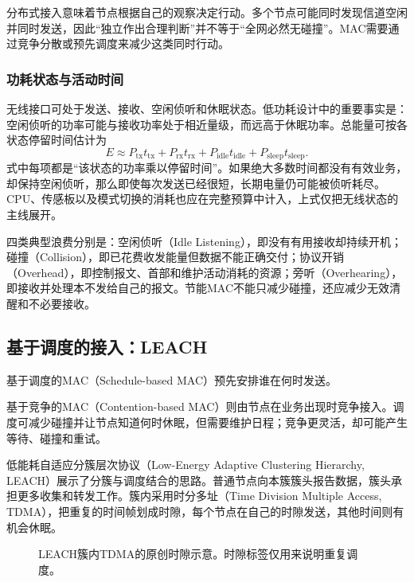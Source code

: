 分布式接入意味着节点根据自己的观察决定行动。多个节点可能同时发现信道空闲并同时发送，因此“独立作出合理判断”并不等于“全网必然无碰撞”。MAC需要通过竞争分散或预先调度来减少这类同时行动。

\subsubsection{功耗状态与活动时间}

无线接口可处于发送、接收、空闲侦听和休眠状态。低功耗设计中的重要事实是：空闲侦听的功率可能与接收功率处于相近量级，而远高于休眠功率。总能量可按各状态停留时间估计为
\begin{equation}
 E\approx P_{\mathrm{tx}}t_{\mathrm{tx}}+
 P_{\mathrm{rx}}t_{\mathrm{rx}}+
 P_{\mathrm{idle}}t_{\mathrm{idle}}+
 P_{\mathrm{sleep}}t_{\mathrm{sleep}}.
\end{equation}
式中每项都是“该状态的功率乘以停留时间”。如果绝大多数时间都没有有效业务，却保持空闲侦听，那么即使每次发送已经很短，长期电量仍可能被侦听耗尽。CPU、传感板以及模式切换的消耗也应在完整预算中计入，上式仅把无线状态的主线展开。

四类典型浪费分别是：空闲侦听（Idle Listening），即没有有用接收却持续开机；碰撞（Collision），即已花费收发能量但数据不能正确交付；协议开销（Overhead），即控制报文、首部和维护活动消耗的资源；旁听（Overhearing），即接收并处理本不发给自己的报文。节能MAC不能只减少碰撞，还应减少无效清醒和不必要接收。

\subsection{基于调度的接入：LEACH}

基于调度的MAC（Schedule-based MAC）预先安排谁在何时发送。

基于竞争的MAC（Contention-based MAC）则由节点在业务出现时竞争接入。调度可减少碰撞并让节点知道何时休眠，但需要维护日程；竞争更灵活，却可能产生等待、碰撞和重试。

低能耗自适应分簇层次协议（Low-Energy Adaptive Clustering Hierarchy, LEACH）展示了分簇与调度结合的思路。普通节点向本簇簇头报告数据，簇头承担更多收集和转发工作。簇内采用时分多址（Time Division Multiple Access, TDMA），把重复的时间帧划成时隙，每个节点在自己的时隙发送，其他时间则有机会休眠。

\begin{figure}[htbp]
\centering
{}
\caption{LEACH簇内TDMA的原创时隙示意。时隙标签仅用来说明重复调度。}
\label{fig:p4-leach}
\end{figure}

